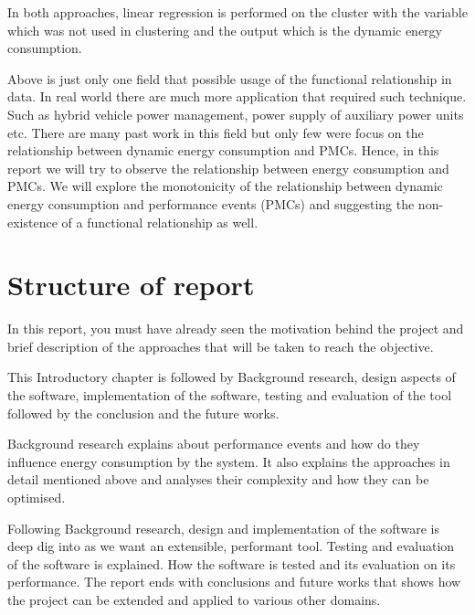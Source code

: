 In both approaches, linear regression is performed on the cluster with the variable which was not used in clustering and the output which is the dynamic energy consumption.

Above is just only one field that possible usage of the functional relationship in data. In real world there are much more application that required such technique. Such as hybrid vehicle power management, power supply of auxiliary power units etc. There are many past work in this field but only few were focus on the relationship between dynamic energy consumption and PMCs. Hence, in this report we will try to observe the relationship between energy consumption and PMCs. We will explore the monotonicity of the relationship between dynamic energy consumption and performance events (PMCs) and suggesting the non-existence of a functional relationship as well.

\section{Structure of report}
In this report, you must have already seen the motivation behind the project and brief description of the approaches that will be taken to reach the objective.

This Introductory chapter is followed by Background research, design aspects of the software, implementation of the software, testing and evaluation of the tool followed by the conclusion and the future works.

Background research explains about performance events and how do they influence energy consumption by the system. It also explains the approaches in detail mentioned above and analyses their complexity and how they can be optimised.

Following Background research, design and implementation of the software is deep dig into as we want an extensible, performant tool. Testing and evaluation of the software is explained. How the software is tested and its evaluation on its performance. The report ends with conclusions and future works that shows how the project can be extended and applied to various other domains.